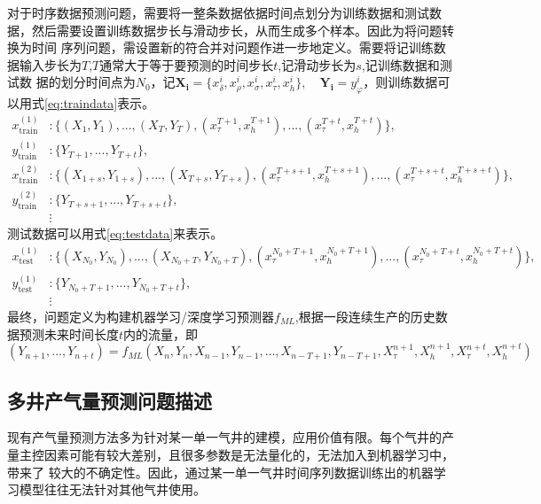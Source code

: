 对于时序数据预测问题，需要将一整条数据依据时间点划分为训练数据和测试数据，然后需要设置训练数据步长与滑动步长，从而生成多个样本。因此为将问题转换为时间
序列问题，需设置新的符合并对问题作进一步地定义。需要将记训练数据输入步长为$T$,$T$通常大于等于要预测的时间步长$t$,记滑动步长为$s$,记训练数据和测试数
据的划分时间点为$N_0$，记$\mathbf{X_i} = \{x^i_\delta, x^i_\rho, x^i_\sigma, x^i_\tau, x^i_h\}, \quad \mathbf{Y_i} = y^i_\varphi$，则训练数据可以用式\eqref{eq:traindata}表示。
\begin{equation}
    \begin{aligned}
    x_{\text{train}}^{(1)} &: \{ (X_1, Y_1), ..., (X_{T}, Y_{T}), (x^{T+1}_{\tau }, x^{T+1}_{h }), ..., (x^{T+t}_{\tau }, x^{T+t}_{h}) \}, \\
    y_{\text{train}}^{(1)} &: \{Y_{T+1}, ... ,Y_{T+t}\}, \\
    x_{\text{train}}^{(2)} &: \{ (X_{1+s}, Y_{1+s}), ..., (X_{T+s}, Y_{T+s}), (x^{T+s+1}_\tau , x^{T+s+1}_h ), ..., (x^{T+s+t}_{\tau }, x^{T+s+t}_{h}) \}, \\
    y_{\text{train}}^{(2)} &: \{Y_{T+s+1}, ... ,Y_{T+s+t}\}, \\
    & \vdots
    \end{aligned}
    \label{eq:traindata}
\end{equation}
测试数据可以用式\eqref{eq:testdata}来表示。
\begin{equation}
    \begin{aligned}
    x_{\text{test}}^{(1)} &: \{ (X_{N_0}, Y_{N_0}), ..., (X_{N_0 + T}, Y_{N_0 + T}), (x^{N_0 + T+1}_{\tau }, x^{N_0 + T+1}_{h }), ..., (x^{N_0 + T+t}_{\tau }, x^{N_0 + T+t}_{h}) \}, \\
    y_{\text{test}}^{(1)} &: \{Y_{N_0 + T+1}, ... ,Y_{N_0 + T+t}\}, \\
    & \vdots
    \end{aligned}
    \label{eq:testdata}
\end{equation}
最终，问题定义为构建机器学习/深度学习预测器$f_{ML }$,根据一段连续生产的历史数据预测未来时间长度$t$内的流量，即
\begin{equation}
    (Y_{n+1}, \ldots, Y_{n+t}) = f_{ML}(X_n, Y_n, X_{n-1}, Y_{n-1}, \ldots, X_{n-T+1}, Y_{n-T+1}, X^{n+1}_{\tau}, X^{n+1}_{h}, X^{n+t}_{\tau}, X^{n+t}_{h})
\end{equation}
    
\subsection{多井产气量预测问题描述}
现有产气量预测方法多为针对某一单一气井的建模，应用价值有限。每个气井的产量主控因素可能有较大差别，且很多参数是无法量化的，无法加入到机器学习中，带来了
较大的不确定性。因此，通过某一单一气井时间序列数据训练出的机器学习模型往往无法针对其他气井使用。

